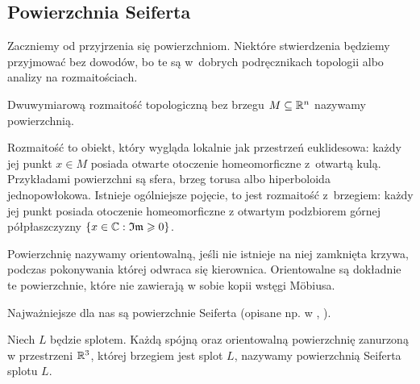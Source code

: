 
\subsection{Powierzchnia Seiferta}
Zaczniemy od przyjrzenia się powierzchniom.
Niektóre stwierdzenia będziemy przyjmować bez dowodów, bo te są w~dobrych podręcznikach topologii albo analizy na rozmaitościach.

\begin{definition}
%
    Dwuwymiarową rozmaitość topologiczną bez brzegu $M \subseteq \mathbb R^n$ nazywamy powierzchnią.
\end{definition}

Rozmaitość to obiekt, który wygląda lokalnie jak przestrzeń euklidesowa: każdy jej punkt $x \in M$ posiada otwarte otoczenie homeomorficzne z~otwartą kulą.
Przykładami powierzchni są sfera, brzeg torusa albo hiperboloida jednopowłokowa.
Istnieje ogólniejsze pojęcie, to jest rozmaitość z~brzegiem: każdy jej punkt posiada otoczenie homeomorficzne z otwartym podzbiorem górnej półpłaszczyzny $\{x \in \mathbb C: \mathfrak {Im} \geqslant 0\}$.


Powierzchnię nazywamy orientowalną, jeśli nie istnieje na niej zamknięta krzywa, podczas pokonywania której odwraca się kierownica.
%
Orientowalne są dokładnie te powierzchnie, które nie zawierają w sobie kopii wstęgi Möbiusa.

%
Najważniejsze dla nas są powierzchnie Seiferta (opisane np. w \cite[s. 46-72]{kawauchi1996}, \cite[s. 19-21]{burde2014}).

\begin{definition}
    Niech $L$ będzie splotem.
    Każdą spójną oraz orientowalną powierzchnię zanurzoną w przestrzeni $\mathbb R^3$, której brzegiem jest splot $L$, nazywamy powierzchnią Seiferta splotu $L$.
\end{definition}


